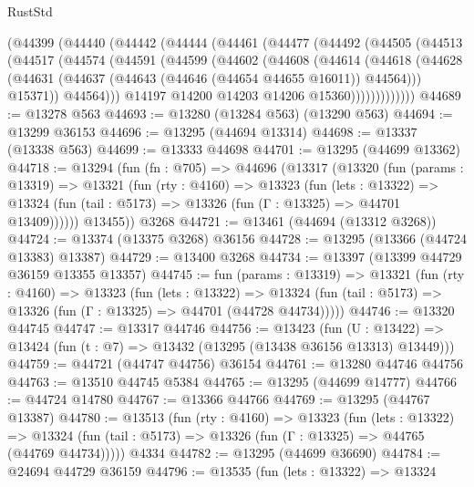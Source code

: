 \begin{lexlean}{RustStd}
\begin{coremodule}
    (@44399
      (@44440
        (@44442
          (@44444
            (@44461
              (@44477
                (@44492
                  (@44505
                    (@44513
                      (@44517
                        (@44574
                          (@44591
                            (@44599
                              (@44602
                                (@44608
                                  (@44614
                                    (@44618
                                      (@44628
                                        (@44631
                                          (@44637 (@44643 (@44646 (@44654 @44655 @16011)) @44564)))
                                        @15371))
                                    @44564)))
                              @14197
                              @14200
                              @14203
                              @14206
                              @15360)))))))))))))
@44689 := @13278 @563
@44693 := @13280 (@13284 @563) (@13290 @563)
@44694 := @13299 @36153
@44696 := @13295 (@44694 @13314)
@44698 := @13337 (@13338 @563)
@44699 := @13333 @44698
@44701 := @13295 (@44699 @13362)
@44718 := @13294
    (fun (fn : @705) =>
    @44696
      (@13317
        (@13320
          (fun (params : @13319) =>
          @13321
            (fun (rty : @4160) =>
            @13323
              (fun (lets : @13322) =>
              @13324 (fun (tail : @5173) => @13326 (fun (Γ : @13325) => @44701 @13409))))))
        @13455))
    @3268
@44721 := @13461 (@44694 (@13312 @3268))
@44724 := @13374 (@13375 @3268) @36156
@44728 := @13295 (@13366 (@44724 @13383) @13387)
@44729 := @13400 @3268
@44734 := @13397 (@13399 @44729 @36159 @13355 @13357)
@44745 := fun (params : @13319) =>
  @13321
    (fun (rty : @4160) =>
    @13323
      (fun (lets : @13322) =>
      @13324 (fun (tail : @5173) => @13326 (fun (Γ : @13325) => @44701 (@44728 @44734)))))
@44746 := @13320 @44745
@44747 := @13317 @44746
@44756 := @13423
    (fun (U : @13422) => @13424 (fun (t : @7) => @13432 (@13295 (@13438 @36156 @13313) @13449)))
@44759 := @44721 (@44747 @44756) @36154
@44761 := @13280 @44746 @44756
@44763 := @13510 @44745 @5384
@44765 := @13295 (@44699 @14777)
@44766 := @44724 @14780
@44767 := @13366 @44766
@44769 := @13295 (@44767 @13387)
@44780 := @13513
    (fun (rty : @4160) =>
    @13323
      (fun (lets : @13322) =>
      @13324 (fun (tail : @5173) => @13326 (fun (Γ : @13325) => @44765 (@44769 @44734)))))
    @4334
@44782 := @13295 (@44699 @36690)
@44784 := @24694 @44729 @36159
@44796 := @13535
    (fun (lets : @13322) =>
    @13324

\end{coremodule}
\end{lexlean}
